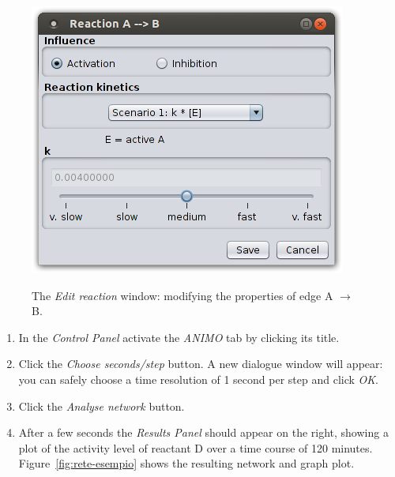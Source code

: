 \begin{figure}[!tpb]
\begin{minipage}{\textwidth}
\begin{center}
\includegraphics[width=.5\textwidth]{images/edit_reactionAB}\\
\caption{The \emph{Edit reaction} window: modifying the properties of edge A $\rightarrow$ B.}\label{fig:edit-reaction}
\end{center}
\end{minipage}
\end{figure}

\begin{enumerate}
\setcounter{enumi}{\value{miocounterperenumerate}}
\item In the \emph{Control Panel} activate the \emph{ANIMO} tab by clicking its title.
\item Click the \emph{Choose seconds/step} button. A new dialogue window will appear: you can
safely choose a time resolution of 1 second per step and click \emph{OK}.
\item Click the \emph{Analyse network} button.
\item After a few seconds the \emph{Results Panel} should appear on the right,
showing a plot of the activity level of reactant D over a time course of 120 minutes.
Figure~\ref{fig:rete-esempio} shows the resulting network and graph plot.
\end{enumerate}

